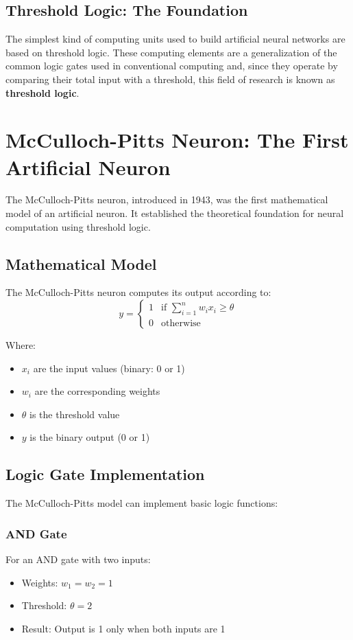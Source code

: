 \subsection{Threshold Logic: The Foundation}
The simplest kind of computing units used to build artificial neural networks are based on threshold logic. These computing elements are a generalization of the common logic gates used in conventional computing and, since they operate by comparing their total input with a threshold, this field of research is known as \textbf{threshold logic}.

\section{McCulloch-Pitts Neuron: The First Artificial Neuron}
The McCulloch-Pitts neuron, introduced in 1943, was the first mathematical model of an artificial neuron. It established the theoretical foundation for neural computation using threshold logic.

\subsection{Mathematical Model}
The McCulloch-Pitts neuron computes its output according to:
\[
y = \begin{cases}
 1 & \text{if } \displaystyle\sum_{i=1}^{n} w_i x_i \geq \theta \\
 0 & \text{otherwise}
\end{cases}
\]

Where:
\begin{itemize}
    \item $x_i$ are the input values (binary: 0 or 1)
    \item $w_i$ are the corresponding weights
    \item $\theta$ is the threshold value
    \item $y$ is the binary output (0 or 1)
\end{itemize}

\subsection{Logic Gate Implementation}
The McCulloch-Pitts model can implement basic logic functions:

\subsubsection{AND Gate}
For an AND gate with two inputs:
\begin{itemize}
    \item Weights: $w_1 = w_2 = 1$
    \item Threshold: $\theta = 2$
    \item Result: Output is 1 only when both inputs are 1
\end{itemize}

